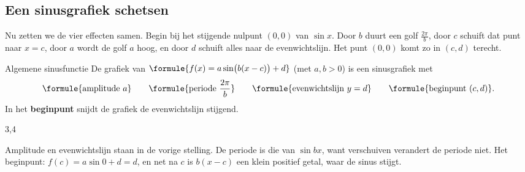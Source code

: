 \begin{oefeningen}
\end{oefeningen}

\subsection{Een sinusgrafiek schetsen}

Nu zetten we de vier effecten samen. Begin bij het stijgende nulpunt $(0, 0)$ van $\sin x$. Door $b$ duurt een golf $\frac{2\pi}{b}$, door $c$ schuift dat punt naar $x = c$, door $a$ wordt de golf $a$ hoog, en door $d$ schuift alles naar de evenwichtslijn. Het punt $(0, 0)$ komt zo in $(c, d)$ terecht.

\begin{theorie}
\begin{stelling}{Algemene sinusfunctie}
De grafiek van $\formule{f(x) = a\sin\bigl(b(x - c)\bigr) + d}$ (met $a, b > 0$) is een sinusgrafiek met
\[\formule{\text{amplitude } a} \qquad \formule{\text{periode } \frac{2\pi}{b}} \qquad \formule{\text{evenwichtslijn } y = d} \qquad \formule{\text{beginpunt } (c, d)}.\]
In het \textbf{\textcolor{accent}{beginpunt}} snijdt de grafiek de evenwichtslijn stijgend.
\end{stelling}
\begin{alleenvoor}{3,4}
\begin{bewijs}
Amplitude en evenwichtslijn staan in de vorige stelling. De periode is die van $\sin bx$, want verschuiven verandert de periode niet. Het beginpunt: $f(c) = a\sin 0 + d = d$, en net na $c$ is $b(x - c)$ een klein positief getal, waar de sinus stijgt.
\end{bewijs}
\end{alleenvoor}
\end{theorie}

